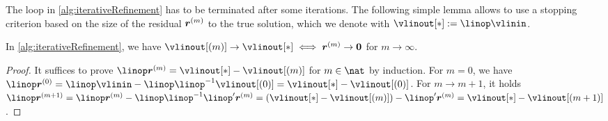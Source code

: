 \begin{algorithm}
  \begin{algorithmic}[1]
      \EndFor{}
      \vspace{-1mm}
    \EndFunction{}
  \end{algorithmic}
  \caption[%
    Iterative refinement%
  ]{%
    Application of a tensor product operator $\linop$
    on spatially adaptive sparse grids with iterative refinement,
    where $\linop'$ is an approximation of $\linop$.
    Inputs are the vector $\vlinin = (\linin{\*l,\*i})_{(\*l,\*i) \in \liset}$
    of input data (function values $\fcnval{\*l,\*i}$ at the grid points) and
    an initial solution $\vlinout[(0)]$.
    The output is the vector
    $\vlinout = (\linout{\*l,\*i})_{(\*l,\*i) \in \liset}$
    of output data (hierarchical surpluses $\surplus{\*l,\*i}$).%
  }%
  \label{alg:iterativeRefinement}%
\end{algorithm}

The loop in \cref{alg:iterativeRefinement} has to be terminated
after some iterations.
The following simple lemma allows to use a stopping criterion based on the
size of the residual ${\boldsymbol{r}}^{(m)}$ to the true solution,
which we denote with $\vlinout[\ast] := \linop \vlinin$.

\begin{shortlemma}
  \label{lemma:iterativeRefinementEquivalent}
  In \cref{alg:iterativeRefinement}, we have
  $\vlinout[(m)] \to \vlinout[\ast] \iff \*r^{(m)} \to \*0$ for
  $m \to \infty$.
\end{shortlemma}

\begin{proof}
  It suffices to prove $\linop \*r^{(m)} = \vlinout[\ast] - \vlinout[(m)]$
  for $m \in \nat$ by induction.
  For $m = 0$, we have
  $\linop \*r^{(0)}
  = \linop \vlinin - \linop \linop^{-1} \vlinout[(0)]
  = \vlinout[\ast] - \vlinout[(0)]$.
  For $m \to m+1$, it holds
  $\linop \*r^{(m+1)}
  = \linop \*r^{(m)} - \linop \linop^{-1} \linop' \*r^{(m)}
  = (\vlinout[\ast] - \vlinout[(m)]) - \linop' \*r^{(m)}
  = \vlinout[\ast] - \vlinout[(m+1)]$.
\end{proof}

